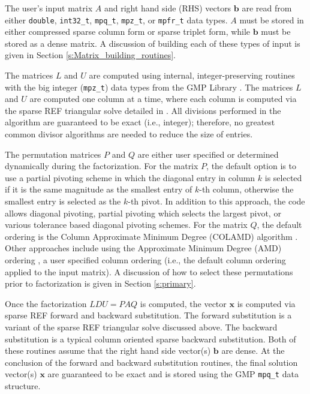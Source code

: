 \documentclass[12pt]{article}
\theoremstyle{definition}
\begin{document}
The user's input matrix $A$ and right hand side (RHS) vectors $\mathbf{b}$ are
read from either \verb|double|, \verb|int32_t|, \verb|mpq_t|, \verb|mpz_t|, or
\verb|mpfr_t| data types. $A$ must be stored in either compressed sparse column
form or sparse triplet form, while $\mathbf{b}$ must be stored as a dense
matrix. A discussion of building each of these types of input is given in
Section \ref{s:Matrix_building_routines}.

The matrices $L$ and $U$ are computed using internal, integer-preserving
routines with the big integer (\verb|mpz_t|) data types from the GMP Library
\cite{granlund2015gnu}. The matrices $L$ and $U$ are computed one column at a
time, where each column is computed via the sparse REF triangular solve
detailed in \cite{lourenco2019exact}. All divisions performed in the algorithm
are guaranteed to be exact (i.e., integer); therefore, no greatest common
divisor algorithms are needed to reduce the size of entries.

The permutation matrices $P$ and $Q$ are either user specified or determined
dynamically during the factorization. For the matrix $P$, the default option is
to use a partial pivoting scheme in which the diagonal entry in column $k$ is
selected if it is the same magnitude as the smallest entry of $k$-th column,
otherwise the smallest entry is selected as the $k$-th pivot. In addition to
this approach, the code allows diagonal pivoting, partial pivoting which
selects the largest pivot, or various tolerance based diagonal pivoting
schemes. For the matrix $Q$, the default ordering is the Column Approximate
Minimum Degree (COLAMD) algorithm
\cite{davis2004algorithmcolamd,davis2004column}. Other approaches include using
the Approximate Minimum Degree (AMD) ordering
\cite{amestoy1996approximate,amestoy2004algorithmamd}, a user specified column
ordering (i.e., the default column ordering applied to the input matrix). A
discussion of how to select these permutations prior to factorization is given
in Section \ref{s:primary}.

Once the factorization $L D U = P A Q $ is computed, the vector $\mathbf{x}$ is
computed via sparse REF forward and backward substitution. The forward
substitution is a variant of the sparse REF triangular solve discussed above.
The backward substitution is a typical column oriented sparse backward
substitution. Both of these routines assume that the right hand side vector(s)
$\mathbf{b}$ are dense. At the conclusion of the forward and backward
substitution routines, the final solution vector(s) $\mathbf{x}$ are guaranteed
to be exact and is stored using the GMP \verb|mpq_t| data structure.
\end{document}
